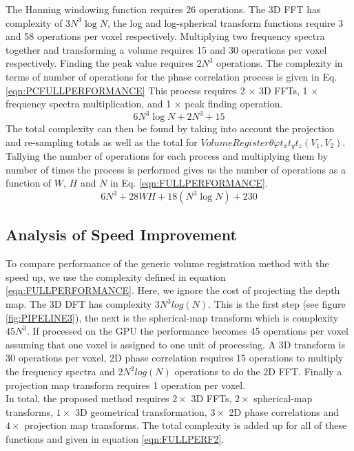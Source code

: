The Hanning windowing function requires 26 operations. The 3D FFT has complexity of $3N^3\log{N}$, the log and log-spherical transform functions require 3 and 58 operations per voxel respectively. Multiplying two frequency spectra together and transforming a volume requires 15 and 30 operations per voxel respectively. Finding the peak value requires $2N^3$ operations. The complexity in terms of number of operations for the phase correlation process is given in Eq. \ref{eqn:PCFULLPERFORMANCE} This process requires 2 $\times$ 3D FFTs, 1 $\times$ frequency spectra multiplication, and 1 $\times$ peak finding operation. 
\begin{equation} \label{eqn:PCFULLPERFORMANCE}
6N^3\log{N} + 2N^3 + 15
\end{equation}
The total complexity can then be found by taking into account the projection and re-sampling totals as well as the total for $VolumeRegister{\theta \varphi t_x t_y t_z}(V_1, V_2)$. Tallying the number of operations for each process and multiplying them by number of times the process is performed gives us the number of operations as a function of $W$, $H$ and $N$ in Eq. \ref{eqn:FULLPERFORMANCE}.
\begin{equation} \label{eqn:FULLPERFORMANCE}
6N^3 + 28WH + 18(N^3\log{N}) + 230
\end{equation}

\subsection{Analysis of Speed Improvement}

To compare performance of the generic volume registration method with the speed up, we use the complexity defined in equation \ref{eqn:FULLPERFORMANCE}. Here, we ignore the cost of projecting the depth map. The 3D DFT has complexity $3N^3log(N)$. This is the first step (see figure \ref{fig:PIPELINE3}), the next is the spherical-map transform which is complexity $45N^3$. If processed on the GPU the performance becomes 45 operations per voxel assuming that one voxel is assigned to one unit of processing. A 3D transform is 30 operations per voxel, 2D phase correlation requires 15 operations to multiply the frequency spectra and $2N^2log(N)$ operations to do the 2D FFT. Finally a projection map transform requires 1 operation per voxel. \\

In total, the proposed method requires $2 \times$ 3D FFTs, $2 \times$ spherical-map transforms, $1 \times$ 3D geometrical transformation, $3 \times$ 2D phase correlations and $4 \times$ projection map transforms. The total complexity is added up for all of these functions and given in equation \ref{eqn:FULLPERF2}. \\

